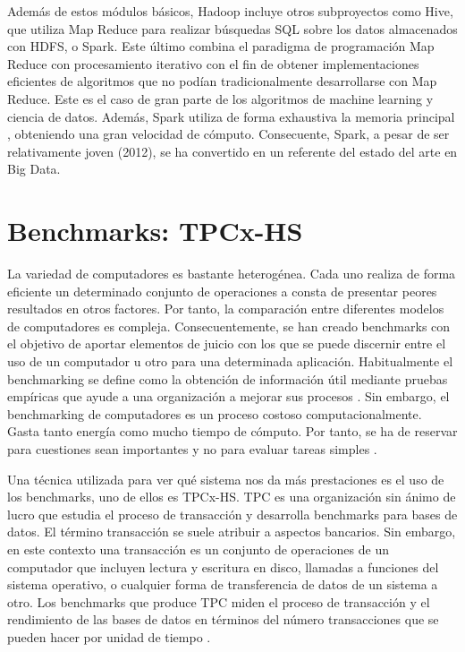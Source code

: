 \documentclass[10pt]{article}
\begin{document}
		Además de estos módulos básicos, Hadoop incluye otros subproyectos como Hive, que utiliza Map Reduce para realizar búsquedas SQL sobre los datos almacenados con HDFS, o Spark. Este último combina el paradigma de programación Map Reduce con procesamiento iterativo \cite{spark-cluster} con el fin de obtener implementaciones eficientes de algoritmos que no podían tradicionalmente desarrollarse con Map Reduce. Este es el caso de gran parte de los algoritmos de machine learning y ciencia de datos. Además, Spark utiliza de forma exhaustiva la memoria principal \cite{spark-rdd}, obteniendo una gran velocidad de cómputo. Consecuente, Spark, a pesar de ser relativamente joven (2012), se ha convertido en un referente del estado del arte en Big Data.
		

\section{Benchmarks: TPCx-HS} \label{sec:tpcx-hs}

	La variedad de computadores es bastante heterogénea. Cada uno realiza de forma eficiente un determinado conjunto de operaciones a consta de presentar peores resultados en otros factores. Por tanto, la comparación entre diferentes modelos de computadores es compleja. Consecuentemente, se han creado benchmarks con el objetivo de aportar elementos de juicio con los que se puede discernir entre el uso de un computador u otro para una determinada aplicación. Habitualmente el benchmarking se define como la obtención de información útil mediante pruebas empíricas que ayude a una organización a mejorar sus procesos \cite{benchmarking}. Sin embargo, el benchmarking de computadores es un proceso costoso computacionalmente. Gasta tanto energía como mucho tiempo de cómputo. Por tanto, se ha de reservar para cuestiones sean importantes y no para evaluar tareas simples \cite{desv-bench}.
	
	Una técnica utilizada para ver qué sistema nos da más prestaciones es el uso de los benchmarks, uno de ellos es TPCx-HS. TPC es una organización sin ánimo de lucro que estudia el proceso de transacción y desarrolla benchmarks para bases de datos. El término transacción se suele atribuir a aspectos bancarios. Sin embargo, en este contexto una transacción es un conjunto de operaciones de un computador que incluyen lectura y escritura en disco, llamadas a funciones del sistema operativo, o cualquier forma de transferencia de datos de un sistema a otro. Los benchmarks que produce TPC miden el proceso de transacción y el rendimiento de las bases de datos en términos del número transacciones que se pueden hacer por unidad de tiempo \cite{intro-tpc}.
	
\end{document}
